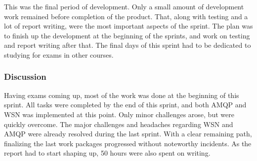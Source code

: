 This was the final period of development. Only a small amount of development work remained before completion of the product. That, along with testing and a lot of report writing, were the most important aspects of the sprint. The plan was to finish up the development at the beginning of the sprints, and work on testing and report writing after that. The final days of this sprint had to be dedicated to studying for exams in other courses.

\subsubsection{Discussion}
\label{subsec:project_lifecycle-development-sprint_6-discussion}

Having exams coming up, most of the work was done at the beginning of this sprint. All tasks were completed by the end of this sprint, and both AMQP and WSN was implemented at this point. Only minor challenges arose, but were quickly overcome. The major challenges and headaches regarding WSN and AMQP were already resolved during the last sprint. With a clear remaining path, finalizing the last work packages progressed without noteworthy incidents. As the report had to start shaping up, 50 hours were also spent on writing.

\clearpage

